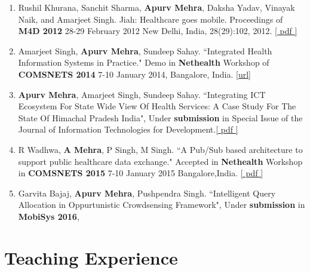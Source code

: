 \documentclass[a4paper,10pt]{article} %
\begin{document}
\begin{enumerate}
	\item{ Rushil Khurana, Sanchit Sharma, \textbf{Apurv Mehra}, Daksha Yadav, Vinayak Naik, and Amarjeet
Singh. Jiah: Healthcare goes mobile. Proceedings of \textbf{ M4D 2012} 28-29 February 2012 New Delhi,
India, 28(29):102, 2012.} \href{http://kau.diva-portal.org/smash/get/diva2:472880/FULLTEXT01#page=119}{[ pdf ]}
	\item{Amarjeet Singh, \textbf{Apurv Mehra}, Sundeep Sahay. ``Integrated Health Information Systems in Practice." Demo in  \textbf{Nethealth} Workshop of \textbf{COMSNETS 2014} 7-10 January 2014,  Bangalore, India.} \href{http://www.comsnets.org/archive/2014/netHealth_workshop.html}{[url]}
	\item{\textbf{Apurv Mehra}, Amarjeet Singh, Sundeep Sahay. ``Integrating ICT Ecosystem For State Wide View Of Health Services: A Case Study For The State Of Himachal Pradesh India", Under \textbf{submission} in Special Issue of the Journal of Information Technologies for Development.}\href{https://dl.dropboxusercontent.com/u/56537440/papers/s1-ln185929431961667701-1939656818Hwf1861541021IdV97398269218592943PDF_HI0001.pdf}{[ pdf ]}
	\item{R Wadhwa, \textbf{A Mehra}, P Singh, M Singh. ``A Pub/Sub based architecture to support public
healthcare data exchange." Accepted in  \textbf{Nethealth} Workshop in \textbf{COMSNETS 2015} 7-10 January 2015 Bangalore,India.} \href{https://dl.dropboxusercontent.com/u/56537440/papers/pubsub.pdf}{[ pdf ]}
	\item{Garvita Bajaj, \textbf{Apurv Mehra}, Pushpendra Singh. ``Intelligent Query Allocation in Oppurtunistic Crowdsensing Framework", Under \textbf{submission} in \textbf{MobiSys 2016}, }

\end{enumerate}



\section{\color{red} Teaching Experience}
\end{document}
